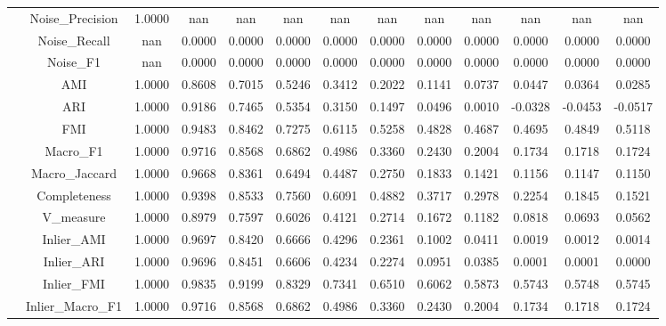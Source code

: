 \begin{table}[ht!]
\begin{tabular*}{\linewidth}{@{} lc c c c c c c c c c c c @{}}
 & Noise_Precision  & 1.0000 & nan & nan & nan & nan & nan & nan & nan & nan & nan & nan \\

 & Noise_Recall  & nan & 0.0000 & 0.0000 & 0.0000 & 0.0000 & 0.0000 & 0.0000 & 0.0000 & 0.0000 & 0.0000 & 0.0000 \\

 & Noise_F1  & nan & 0.0000 & 0.0000 & 0.0000 & 0.0000 & 0.0000 & 0.0000 & 0.0000 & 0.0000 & 0.0000 & 0.0000 \\
\addlinespace
\multirow{17}{*}{IZGC}
 & AMI  & 1.0000 & 0.8608 & 0.7015 & 0.5246 & 0.3412 & 0.2022 & 0.1141 & 0.0737 & 0.0447 & 0.0364 & 0.0285 \\

 & ARI  & 1.0000 & 0.9186 & 0.7465 & 0.5354 & 0.3150 & 0.1497 & 0.0496 & 0.0010 & -0.0328 & -0.0453 & -0.0517 \\

 & FMI  & 1.0000 & 0.9483 & 0.8462 & 0.7275 & 0.6115 & 0.5258 & 0.4828 & 0.4687 & 0.4695 & 0.4849 & 0.5118 \\

 & Macro_F1  & 1.0000 & 0.9716 & 0.8568 & 0.6862 & 0.4986 & 0.3360 & 0.2430 & 0.2004 & 0.1734 & 0.1718 & 0.1724 \\

 & Macro_Jaccard  & 1.0000 & 0.9668 & 0.8361 & 0.6494 & 0.4487 & 0.2750 & 0.1833 & 0.1421 & 0.1156 & 0.1147 & 0.1150 \\

 & Completeness  & 1.0000 & 0.9398 & 0.8533 & 0.7560 & 0.6091 & 0.4882 & 0.3717 & 0.2978 & 0.2254 & 0.1845 & 0.1521 \\

 & V_measure  & 1.0000 & 0.8979 & 0.7597 & 0.6026 & 0.4121 & 0.2714 & 0.1672 & 0.1182 & 0.0818 & 0.0693 & 0.0562 \\

 & Inlier_AMI  & 1.0000 & 0.9697 & 0.8420 & 0.6666 & 0.4296 & 0.2361 & 0.1002 & 0.0411 & 0.0019 & 0.0012 & 0.0014 \\

 & Inlier_ARI  & 1.0000 & 0.9696 & 0.8451 & 0.6606 & 0.4234 & 0.2274 & 0.0951 & 0.0385 & 0.0001 & 0.0001 & 0.0000 \\

 & Inlier_FMI  & 1.0000 & 0.9835 & 0.9199 & 0.8329 & 0.7341 & 0.6510 & 0.6062 & 0.5873 & 0.5743 & 0.5748 & 0.5745 \\

 & Inlier_Macro_F1  & 1.0000 & 0.9716 & 0.8568 & 0.6862 & 0.4986 & 0.3360 & 0.2430 & 0.2004 & 0.1734 & 0.1718 & 0.1724 \\


\end{tabular*}
\end{table}
